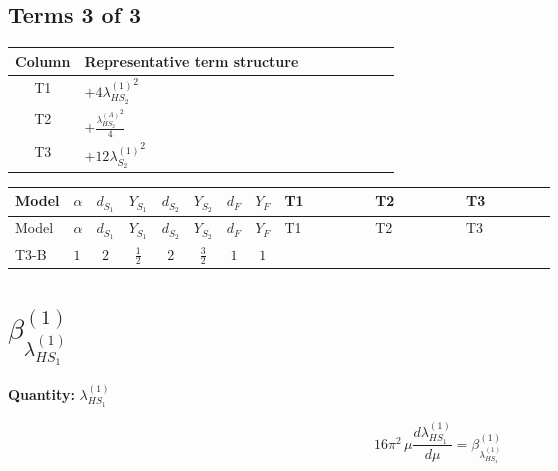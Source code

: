 \documentclass[8pt]{article}
\begin{document}
\begin{landscape}
\subsection*{Terms 3 of 3}
\begin{center}
\begin{tabular}{@{}c >{\raggedright\arraybackslash}p{0.82\linewidth}@{}}
\toprule
Column & Representative term structure \\
\midrule
T1 & \(\displaystyle +4 {\lambda_{HS_2}^{(1)}}^2\) \\
\midrule
T2 & \(\displaystyle +\frac{{\lambda_{HS_2}^{(A)}}^2}{4}\) \\
\midrule
T3 & \(\displaystyle +12 {\lambda_{S_2}^{(1)}}^2\) \\
\midrule
\bottomrule
\end{tabular}
\end{center}
\smallskip
\tiny
\begin{longtable}{@{}llcccccc >{\raggedright\arraybackslash}p{0.21\linewidth} >{\raggedright\arraybackslash}p{0.21\linewidth} >{\raggedright\arraybackslash}p{0.21\linewidth}@{}}
\toprule
Model & $\alpha$ & $d_{S_1}$ & $Y_{S_1}$ & $d_{S_2}$ & $Y_{S_2}$ & $d_F$ & $Y_F$ & T1 & T2 & T3 \\
\midrule
\endfirsthead
\toprule
Model & $\alpha$ & $d_{S_1}$ & $Y_{S_1}$ & $d_{S_2}$ & $Y_{S_2}$ & $d_F$ & $Y_F$ & T1 & T2 & T3 \\
\midrule
\endhead
T3-B & $1$ & $2$ & $\frac{1}{2}$ & $2$ & $\frac{3}{2}$ & $1$ & $1$ & \scriptsize\adjustbox{max width=\linewidth}{$\begin{gathered} +4 {\lambda_{HS_2}^{(1)}}^2\end{gathered}$} & \scriptsize\adjustbox{max width=\linewidth}{$\begin{gathered} +\frac{{\lambda_{HS_2}^{(A)}}^2}{4}\end{gathered}$} & \scriptsize\adjustbox{max width=\linewidth}{$\begin{gathered} +12 {\lambda_{S_2}^{(1)}}^2\end{gathered}$} \\
\midrule
\bottomrule
\end{longtable}
\clearpage
\section*{$\beta_{\lambda_{HS_1}^{(1)}}^{(1)}$}
\noindent\textbf{Quantity: }$\lambda_{HS_1}^{(1)}$\par\smallskip
\[16\pi^2\,\mu\frac{d \lambda_{HS_1}^{(1)}}{d\mu}=\beta_{\lambda_{HS_1}^{(1)}}^{(1)}\]

\end{landscape}
\end{document}
